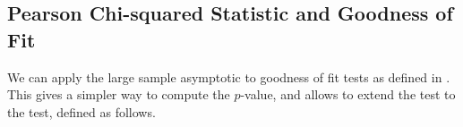%
%
%

\subsection{Pearson Chi-squared Statistic and Goodness of Fit}
 We can apply the large sample asymptotic to
goodness of fit tests as defined in . This
gives a simpler way to compute the $p$-value, and allows to extend
the test to the  test, defined as
follows.

